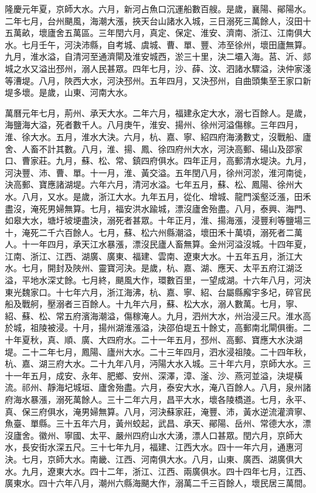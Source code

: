 \begin{pinyinscope}
隆慶元年夏，京師大水。六月，新河占魚口沉運船數百艘。是歲，襄陽、鄖陽水。二年七月，台州颶風，海潮大漲，挾天台山諸水入城，三日溺死三萬餘人，沒田十五萬畝，壞廬舍五萬區。三年閏六月，真定、保定、淮安、濟南、浙江、江南俱大水。七月壬午，河決沛縣，自考城、虞城、曹、單、豐、沛至徐州，壞田廬無算。九月，淮水溢，自清河至通濟閘及淮安城西，淤三十里，決二壩入海。莒、沂、郯城之水又溢出邳州，溺人民甚眾。四年七月，沙、薛、汶、泗諸水驟溢，決仲家淺等漕堤。八月，陜西大水，河決邳州。五年四月，又決邳州，自曲頭集至王家口新堤多壞。是歲，山東、河南大水。

萬曆元年七月，荊州、承天大水。二年六月，福建永定大水，溺七百餘人。是歲，海鹽海大溢，死者數千人。八月庚午，淮安、揚州、徐州河溢傷稼。三年四月，淮、徐大水。五月，淮水大決。六月，杭、嘉、寧、紹四府海湧數丈，沒戰船、廬舍、人畜不計其數。八月，淮、揚、鳳、徐四府州大水，河決高郵、碭山及邵家口、曹家莊。九月，蘇、松、常、鎮四府俱水。四年正月，高郵清水堤決。九月，河決豐、沛、曹、單。十一月，淮、黃交溢。五年閏八月，徐州河淤，淮河南徙，決高郵、寶應諸湖堤。六年六月，清河水溢。七年五月，蘇、松、鳳陽、徐州大水。八月，又水。是歲，浙江大水。九年五月，從化、增城、龍門溪壑泛漲，田禾盡沒，淹死男婦無算。七月，福安洪水踰城，漂沒廬舍殆盡。八月，泰興、海門、如皋大水，塘圩坡埂盡決，溺死者甚眾。十年正月，淮、揚海漲，浸豐利等鹽場三十，淹死二千六百餘人。七月，蘇、松六州縣潮溢，壞田禾十萬頃，溺死者二萬人。十一年四月，承天江水暴漲，漂沒民廬人畜無算。金州河溢沒城。十四年夏，江南、浙江、江西、湖廣、廣東、福建、雲南、遼東大水。十五年五月，浙江大水。七月，開封及陜州、靈寶河決。是歲，杭、嘉、湖、應天、太平五府江湖泛溢，平地水深丈餘。七月終，颶風大作，環數百里，一望成湖。十六年八月，河決東光魏家口。十七年六月，浙江海沸，杭、嘉、寧、紹、台屬縣廨宇多圮，碎官民船及戰舸，壓溺者三百餘人。十九年六月，蘇、松大水，溺人數萬。七月，寧、紹、蘇、松、常五府濱海潮溢，傷稼淹人。九月，泗州大水，州治浸三尺。淮水高於城，祖陵被浸。十月，揚州湖淮漲溢，決邵伯堤五十餘丈，高郵南北閘俱衝。二十年夏秋，真、順、廣、大四府水。二十一年五月，邳州、高郵、寶應大水決湖堤。二十二年七月，鳳陽、廬州大水。二十三年四月，泗水浸祖陵。二十四年秋，杭、嘉、湖三府大水。二十九年八月，沔陽大水入城。三十年六月，京師大水。三十一年五月，成安、永年、肥鄉、安州、深澤，漳、滏、沙、燕河並溢，決堤橫流。祁州、靜海圮城垣、廬舍殆盡。六月，泰安大水，淹八百餘人。八月，泉州諸府海水暴漲，溺死萬餘人。三十二年六月，昌平大水，壞各陵橋道。七月，永平、真、保三府俱水，淹男婦無算。八月，河決蘇家莊，淹豐、沛，黃水逆流灌濟寧、魚臺、單縣。三十五年六月，黃州蛟起，武昌、承天、鄖陽、岳州、常德大水，漂沒廬舍。徽州、寧國、太平、嚴州四府山水大湧，漂人口甚眾。閏六月，京師大水，長安街水深五尺。三十七年九月，福建、江西大水。四十一年六月，通惠河決。七月，京師大水。南畿、江西、河南俱大水。八月，山東、廣西、湖廣俱大水。九月，遼東大水。四十二年，浙江、江西、兩廣俱水。四十四年七月，江西、廣東水。四十六年八月，潮州六縣海颶大作，溺萬二千三百餘人，壞民居三萬間。


\end{pinyinscope}
